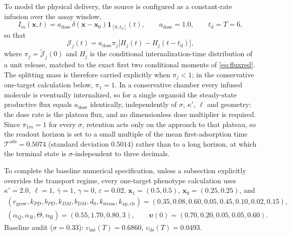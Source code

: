 \documentclass[pdflatex,sn-mathphys-num]{sn-jnl}
\numberwithin{equation}{section}
\theoremstyle{thmstyleone}%
\theoremstyle{definition}
\theoremstyle{remark}
\begin{document}
To model the physical delivery, the source is configured as a constant-rate infusion over the assay window,
\begin{equation}
I_m(\mathbf x,t)=a_{\mathrm{dose}}\,\delta(\mathbf x-\mathbf x_0)
\mathbf 1_{[0,t_{\mathrm d}]}(t),
\qquad a_{\mathrm{dose}}=1.0,\qquad t_{\mathrm d}=T=6,
\label{eq:dosing}
\end{equation}
so that
\begin{equation}
\mathcal J_j(t)=a_{\mathrm{dose}}\pi_j
\bigl[H_j(t)-H_j(t-t_{\mathrm d})\bigr],
\label{eq:pulseconv}
\end{equation}
where $\pi_j=\widetilde{\mathcal J}_j(0)$ and $H_j$ is the conditional internalization-time distribution of a unit release, matched to the exact first two conditional moments of \eqref{eq:fluxred}. The splitting mass is therefore carried explicitly when $\pi_j<1$; in the conservative one-target calculation below, $\pi_1=1$. In a conservative chamber every infused molecule is eventually internalized, so for a single organoid the steady-state productive flux equals $a_{\mathrm{dose}}$ identically, independently of $\sigma$, $\kappa'$, $\ell$ and geometry: the dose rate is the plateau flux, and no dimensionless dose multiplier is required. Since $\pi_{1m}=1$ for every $\sigma$, retention acts only on the approach to that plateau, so the readout horizon is set to a small multiple of the mean first-adsorption time
$\mathcal T^{\mathrm{ads}}=0.5074$ (standard deviation $0.5014$) rather than to a long horizon, at which the terminal state is $\sigma$-independent to three decimals.

To complete the baseline numerical specification, unless a subsection explicitly overrides the transport regime, every one-target phenotype calculation uses $\kappa'=2.0$, $\ell=1$, $\bar\gamma=1$, $\gamma=0$, $\varepsilon=0.02$, $\mathbf x_1=(0.5,0.5)$, $\mathbf x_0=(0.25,0.25)$, and
\begin{gather}
(r_{\mathrm{grow}},k_{PD},b_{PD},k_{DM},b_{DM},d_0,k_{\mathrm{stress}},
k_{\mathrm{ap,clr}})=(0.35,0.08,0.60,0.05,0.45,0.10,0.02,0.15),\nonumber\\
(\alpha_Q,\alpha_R,\Theta,n_{\mathrm H})=(0.55,1.70,0.80,3),\qquad
\boldsymbol\upsilon(0)=(0.70,0.20,0.05,0.05,0.60).
\label{eq:params}
\end{gather}
Baseline audit ($\sigma=0.33$): $\upsilon_{\mathrm{mt}}(T)=0.6860$, $\upsilon_{\mathrm{ds}}(T)=0.0493$.
\end{document}
